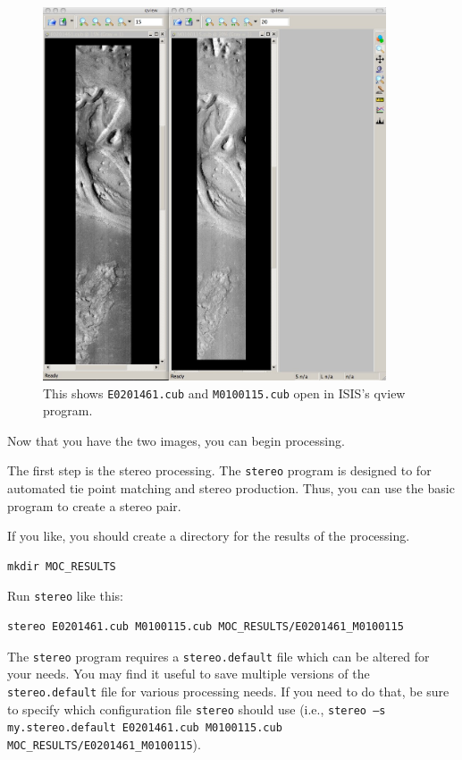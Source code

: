 \begin{figure}
\begin{center}
\includegraphics[width=4in]{images/p19-images.png}
\caption[P19 images open in qview]{
    \label{p19-images}
    This shows \texttt{E0201461.cub} and \texttt{M0100115.cub} open in
	ISIS's qview program.
    }
\end{center}
\end{figure}

Now that you have the two images, you can begin processing. 

The first step is the stereo processing. The \texttt{stereo} program is
designed to for automated tie point matching and stereo production.
Thus, you can use the basic program to create a stereo pair.

If you like, you should create a directory for the results of the processing. 

\begin{verbatim}
mkdir MOC_RESULTS
\end{verbatim}

Run \texttt{stereo} like this:

\begin{verbatim}
stereo E0201461.cub M0100115.cub MOC_RESULTS/E0201461_M0100115
\end{verbatim}

The \texttt{stereo} program requires a \texttt{stereo.default} file
which can be altered for your needs. You may find it useful to save
multiple versions of the \texttt{stereo.default} file for various
processing needs. If you need to do that, be sure to specify which
configuration file \texttt{stereo} should use (i.e., \texttt{stereo
–s my.stereo.default E0201461.cub M0100115.cub
MOC\_RESULTS/E0201461\_M0100115}).

